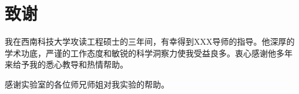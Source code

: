 \chapter{致谢}

我在西南科技大学攻读工程硕士的三年间，有幸得到XXX导师的指导。他深厚的
学术功底，严谨的工作态度和敏锐的科学洞察力使我受益良多。衷心感谢他多年
来给予我的悉心教导和热情帮助。

感谢实验室的各位师兄师姐对我实验的帮助。

